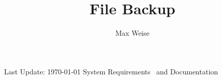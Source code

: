 \documentclass[12pt, a4paper, draft]{scrreprt}
\title{File Backup}
\author{Max Weise}
\begin{document}
\deckblatt
{\thetitle}
{\theauthor}
{}
{}
{Last Update: \today}
{System Requirements ~and Documentation}

\newpage

\tableofcontents










\end{document}

